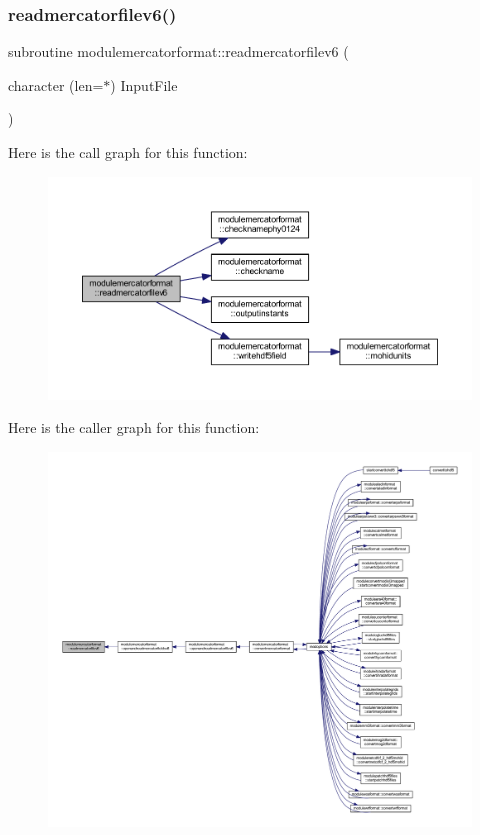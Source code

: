 \subsubsection{\texorpdfstring{readmercatorfilev6()}{readmercatorfilev6()}}
{\footnotesize\ttfamily subroutine modulemercatorformat\+::readmercatorfilev6 (\begin{DoxyParamCaption}\item[{character (len=$\ast$)}]{Input\+File }\end{DoxyParamCaption})\hspace{0.3cm}{\ttfamily [private]}}

Here is the call graph for this function\+:\nopagebreak
\begin{figure}[H]
\begin{center}
\leavevmode
\includegraphics[width=350pt]{namespacemodulemercatorformat_a581fc371026e728b42cbf50f824fc39f_cgraph}
\end{center}
\end{figure}
Here is the caller graph for this function\+:\nopagebreak
\begin{figure}[H]
\begin{center}
\leavevmode
\includegraphics[width=350pt]{namespacemodulemercatorformat_a581fc371026e728b42cbf50f824fc39f_icgraph}
\end{center}
\end{figure}
\mbox{\label{namespacemodulemercatorformat_a610d0a01acb7506904c2ea4c84bc688e}} 
